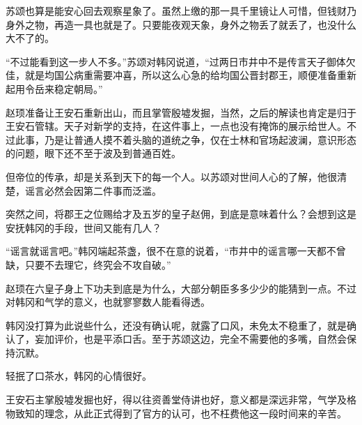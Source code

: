 苏颂也算是能安心回去观察星象了。虽然上缴的那一具千里镜让人可惜，但钱财乃身外之物，再造一具也就是了。只要能夜观天象，身外之物丢了就丢了，也没什么大不了的。

“不过能看到这一步人不多。”苏颂对韩冈说道，“过两日市井中不是传言天子御体欠佳，就是均国公病重需要冲喜，所以这么心急的给均国公晋封郡王，顺便准备重新起用令岳来稳定朝局。”

赵顼准备让王安石重新出山，而且掌管殷墟发掘，当然，之后的解读也肯定是归于王安石管辖。天子对新学的支持，在这件事上，一点也没有掩饰的展示给世人。不过此事，乃是让普通人摸不着头脑的道统之争，仅在士林和官场起波澜，意识形态的问题，眼下还不至于波及到普通百姓。

但帝位的传承，却是关系到天下的每一个人。以苏颂对世间人心的了解，他很清楚，谣言必然会因第二件事而泛滥。

突然之间，将郡王之位赐给才及五岁的皇子赵佣，到底是意味着什么？会想到这是安抚韩冈的手段，世间又能有几人？

“谣言就谣言吧。”韩冈端起茶盏，很不在意的说着，“市井中的谣言哪一天都不曾缺，只要不去理它，终究会不攻自破。”

赵顼在六皇子身上下功夫到底是为什么，大部分朝臣多多少少的能猜到一点。不过对韩冈和气学的意义，也就寥寥数人能看得透。

韩冈没打算为此说些什么，还没有确认呢，就露了口风，未免太不稳重了，就是确认了，妄加评价，也是平添口舌。至于苏颂这边，完全不需要他的多嘴，自然会保持沉默。

轻抿了口茶水，韩冈的心情很好。

王安石主掌殷墟发掘也好，得以往资善堂侍讲也好，意义都是深远非常，气学及格物致知的理念，从此正式得到了官方的认可，也不枉费他这一段时间来的辛苦。

